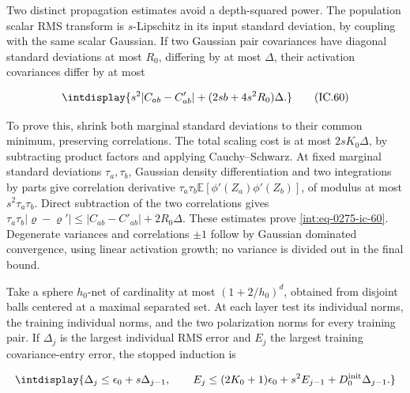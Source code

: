 
Two distinct propagation estimates avoid a depth-squared power. The population scalar RMS transform is \(s\)-Lipschitz in its input standard deviation, by coupling with the same scalar Gaussian. If two Gaussian pair covariances have diagonal standard deviations at most \(R_0\), differing by at most \(\Delta\), their activation covariances differ by at most


\begingroup\renewcommand{\theHequation}{intdisplay.650}
\begin{equation}
\intdisplay{
s^2|C_{ab}-C'_{ab}|+(2sb+4s^2R_0)\Delta.
}
\tag{IC.60}
\label{int:eq-0275-ic-60}
\end{equation}
\endgroup


To prove this, shrink both marginal standard deviations to their common minimum, preserving correlations. The total scaling cost is at most \(2sK_0\Delta\), by subtracting product factors and applying Cauchy--Schwarz. At fixed marginal standard deviations \(\tau_a,\allowbreak \tau_b\), Gaussian density differentiation and two integrations by parts give correlation derivative \(\tau_a\tau_b\mathbb E[\phi'(Z_a)\phi'(Z_b)]\), of modulus at most \(s^2\tau_a\tau_b\). Direct subtraction of the two correlations gives \(\tau_a\tau_b|\varrho-\varrho'| \le|C_{ab}-C'_{ab}|+2R_0\Delta\). These estimates prove \eqref{int:eq-0275-ic-60}. Degenerate variances and correlations \(\pm1\) follow by Gaussian dominated convergence, using linear activation growth; no variance is divided out in the final bound.



Take a sphere \(h_0\)-net of cardinality at most \((1+2/h_0)^d\), obtained from disjoint balls centered at a maximal separated set. At each layer test its individual norms, the training individual norms, and the two polarization norms for every training pair. If \(\Delta_j\) is the largest individual RMS error and \(E_j\) the largest training covariance-entry error, the stopped induction is


\begingroup\renewcommand{\theHequation}{intdisplay.651}
\begin{equation*}
\intdisplay{
\Delta_j\le\epsilon_0+s\Delta_{j-1},\qquad
 E_j\le(2K_0+1)\epsilon_0+s^2E_{j-1}
                             +D_0^{\rm init}\Delta_{j-1}.
}
\end{equation*}
\endgroup

